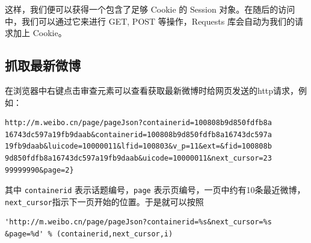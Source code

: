\documentclass[a4paper,UTF8]{ctexart}
\newenvironment{Shaded}{}{}
\newcommand{\DecValTok}[1]{\textcolor[rgb]{0.25,0.63,0.44}{{#1}}}
\newcommand{\SpecialCharTok}[1]{\textcolor[rgb]{0.25,0.44,0.63}{{#1}}}
\newcommand{\StringTok}[1]{\textcolor[rgb]{0.25,0.44,0.63}{{#1}}}
\newcommand{\CommentTok}[1]{\textcolor[rgb]{0.38,0.63,0.69}{\textit{{#1}}}}
\newcommand{\VariableTok}[1]{\textcolor[rgb]{0.10,0.09,0.49}{{#1}}}
\newcommand{\ControlFlowTok}[1]{\textcolor[rgb]{0.00,0.44,0.13}{\textbf{{#1}}}}
\newcommand{\OperatorTok}[1]{\textcolor[rgb]{0.40,0.40,0.40}{{#1}}}
\newcommand{\PreprocessorTok}[1]{\textcolor[rgb]{0.74,0.48,0.00}{{#1}}}
\newcommand{\NormalTok}[1]{{#1}}
\begin{document}
\begin{Shaded}
\end{Shaded}

这样，我们便可以获得一个包含了足够 Cookie 的 Session
对象。在随后的访问中，我们可以通过它来进行 GET, POST 等操作，Requests
库会自动为我们的请求加上 Cookie。

\subsection{抓取最新微博}\label{ux6293ux53d6ux6700ux65b0ux5faeux535a}

在浏览器中右键点击审查元素可以查看获取最新微博时给网页发送的http请求，例如：

\begin{verbatim}
http://m.weibo.cn/page/pageJson?containerid=100808b9d850fdfb8a
16743dc597a19fb9daab&containerid=100808b9d850fdfb8a16743dc597a
19fb9daab&luicode=10000011&lfid=100803&v_p=11&ext=&fid=100808b
9d850fdfb8a16743dc597a19fb9daab&uicode=10000011&next_cursor=23
99999990&page=2}
\end{verbatim}

其中 \texttt{containerid} 表示话题编号，\texttt{page}
表示页编号，一页中约有10条最近微博，\texttt{next\_cursor}指示下一页开始的位置。于是就可以按照

\begin{verbatim}
'http://m.weibo.cn/page/pageJson?containerid=%s&next_cursor=%s
&page=%d' % (containerid,next_cursor,i)
\end{verbatim}
\end{document}
